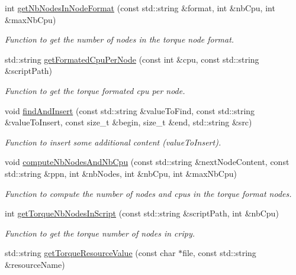 \begin{DoxyCompactItemize}
int \hyperlink{classTorqueServer_a6c021e8406f45d2e06f6232d8e0279ea}{getNbNodesInNodeFormat} (const std::string \&format, int \&nbCpu, int \&maxNbCpu)
\begin{DoxyCompactList}\small\item\em Function to get the number of nodes in the torque node format. \item\end{DoxyCompactList}\item 
std::string \hyperlink{classTorqueServer_aa43c09a2a522df515a6b0b4334ed96d8}{getFormatedCpuPerNode} (const int \&cpu, const std::string \&scriptPath)
\begin{DoxyCompactList}\small\item\em Function to get the torque formated cpu per node. \item\end{DoxyCompactList}\item 
void \hyperlink{classTorqueServer_ad7eff84c7ffb7596b28e80650aa59c2b}{findAndInsert} (const std::string \&valueToFind, const std::string \&valueToInsert, const size\_\-t \&begin, size\_\-t \&end, std::string \&src)
\begin{DoxyCompactList}\small\item\em Function to insert some additional content (valueToInsert). \item\end{DoxyCompactList}\item 
void \hyperlink{classTorqueServer_a6be0e0721b4f7713181e0ff43a696e5d}{computeNbNodesAndNbCpu} (const std::string \&nextNodeContent, const std::string \&ppn, int \&nbNodes, int \&nbCpu, int \&maxNbCpu)
\begin{DoxyCompactList}\small\item\em Function to compute the number of nodes and cpus in the torque format nodes. \item\end{DoxyCompactList}\item 
int \hyperlink{classTorqueServer_a9b1f022f047fe9347fb21648ba15bc52}{getTorqueNbNodesInScript} (const std::string \&scriptPath, int \&nbCpu)
\begin{DoxyCompactList}\small\item\em Function to get the torque number of nodes in cripy. \item\end{DoxyCompactList}\item 
std::string \hyperlink{classTorqueServer_a5e7fe92d9def0402948b9e29c817861e}{getTorqueResourceValue} (const char $\ast$file, const std::string \&resourceName)

\end{DoxyCompactItemize}
